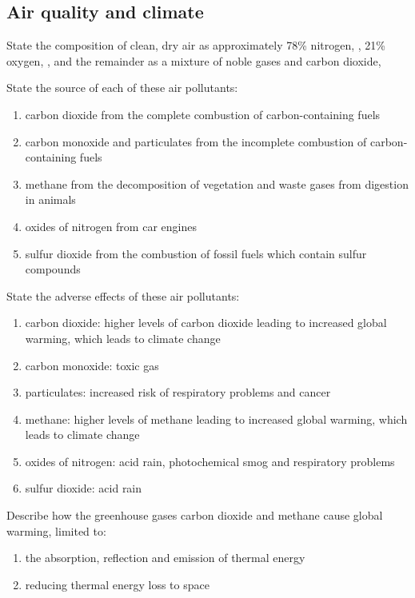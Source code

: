 \subsection{Air quality and climate}
\begin{point}
	State the composition of clean, dry air as approximately 78\% nitrogen, , 21\% oxygen, , and the
	remainder as a mixture of noble gases and carbon dioxide, 
\end{point}

\begin{point}
State the source of each of these air pollutants:
\begin{enumerate}[label=(\alph*)]
	\setlength\itemsep{0em}
	\item carbon dioxide from the complete combustion of carbon-containing fuels
	\item carbon monoxide and particulates from the incomplete combustion of carbon-containing fuels
	\item methane from the decomposition of vegetation and waste gases from digestion in animals
	\item oxides of nitrogen from car engines
	\item sulfur dioxide from the combustion of fossil fuels which contain sulfur compounds
\end{enumerate}
\end{point}

\begin{point}
State the adverse effects of these air pollutants:
\begin{enumerate}[label=(\alph*)]
	\setlength\itemsep{0em}
	\item carbon dioxide: higher levels of carbon dioxide leading to increased global warming, which leads to 
		climate change
	\item carbon monoxide: toxic gas
	\item particulates: increased risk of respiratory problems and cancer
	\item methane: higher levels of methane leading to increased global warming, which leads to
		climate change
	\item oxides of nitrogen: acid rain, photochemical smog and respiratory problems
	\item sulfur dioxide: acid rain
\end{enumerate}
\end{point}

\begin{point}
Describe how the greenhouse gases carbon dioxide and methane cause global warming, limited to:
\begin{enumerate}[label=(\alph*)]
	\setlength\itemsep{0em}
	\item the absorption, reflection and emission of thermal energy 
	\item reducing thermal energy loss to space
\end{enumerate}
\end{point}

